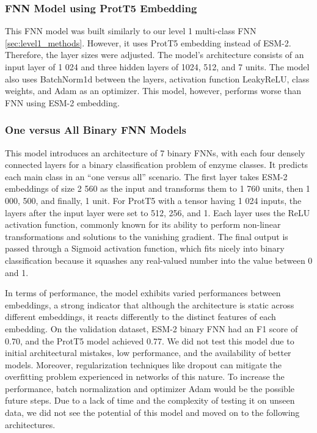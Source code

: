 \documentclass{bioinfo}
\begin{document}
\subsubsection{FNN Model using ProtT5 Embedding}
This FNN model was built similarly to our level 1 multi-class FNN \ref{sec:level1_methods}. 
However, it uses ProtT5 embedding instead of ESM-2. 
Therefore, the layer sizes were adjusted. The model's architecture consists of an input layer of 1 024 
and three hidden layers of 1024, 512, and 7 units. The model also uses BatchNorm1d between the layers, 
activation function LeakyReLU, class weights, and Adam as an optimizer. This model, however, performs worse than 
FNN using ESM-2 embedding.

\subsubsection{One versus All Binary FNN Models}
This model introduces an architecture of 7 binary FNNs, with each four densely connected layers for a binary classification problem of enzyme classes. It predicts each main class in an ``one versus all'' scenario.
The first layer takes ESM-2 embeddings of size 2 560 as the input and transforms them to 1 760 units, then 1 000, 500, and finally, 1 unit. For ProtT5 with a tensor having 1 024 inputs, the layers after the input layer were set to 512, 256, and 1.
Each layer uses the ReLU activation function, commonly known for its ability to perform non-linear transformations and solutions to the vanishing gradient.
The final output is passed through a Sigmoid activation function, which fits nicely into binary classification because it squashes any real-valued number into the value between 0 and 1. 

In terms of performance, the model exhibits varied performances between embeddings, a strong indicator that although the architecture is static across different embeddings, it reacts differently to the distinct features of each embedding.
On the validation dataset, ESM-2 binary FNN had an F1 score of 0.70, and the ProtT5 model achieved 0.77. We did not test this model due to initial architectural mistakes, low performance, and the availability of better models.
Moreover, regularization techniques like dropout can mitigate the overfitting problem experienced in networks of this nature. To increase the performance, batch normalization and optimizer Adam would be the possible future steps. Due to a lack of time and the complexity of testing it on unseen data, we did not see the potential of this model and moved on to the following architectures.
\end{document}

